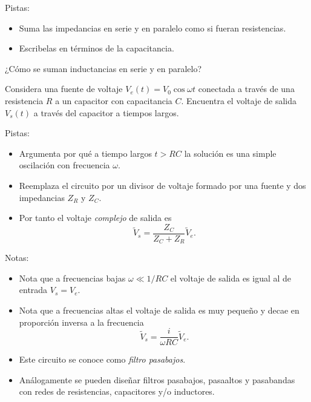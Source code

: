 \documentclass{exam}
\begin{document}
\begin{questions}
  Pistas:
    \begin{itemize}
    \item Suma las impedancias en serie y en paralelo como si fueran
      resistencias.
    \item Escribelas en términos de la capacitancia.
    \end{itemize}

    \question ¿Cómo se suman inductancias en serie y en paralelo?

    \question Considera una fuente de voltaje $V_e(t)=V_0\cos\omega t$
    conectada a través de una resistencia $R$ a un capacitor con
    capacitancia $C$.
    Encuentra el voltaje de salida $V_s(t)$ a través del capacitor a tiempos largos.

    Pistas:
    \begin{itemize}
    \item Argumenta por qué a tiempo largos $t>RC$ la solución es una
      simple oscilación con frecuencia $\omega$.
    \item Reemplaza el circuito por un divisor de voltaje formado por
      una fuente y dos impedancias $Z_R$ y $Z_C$.
    \item Por tanto el voltaje {\em complejo} de salida es
      $$\tilde V_s=\frac{Z_C}{Z_C+Z_R}\tilde V_e.$$
    \end{itemize}

    Notas:
    \begin{itemize}
    \item Nota que a frecuencias bajas $\omega\ll 1/RC$ el voltaje de
      salida es igual al de entrada $V_s=V_e$.
    \item Nota que a frecuencias altas el voltaje de salida es muy
      pequeño y decae en proporción inversa a la frecuencia
      $$\tilde V_s=\frac{i}{\omega RC} \tilde V_e.$$
    \item Este circuito se conoce como {\em filtro pasabajos}.
    \item Análogamente se pueden diseñar filtros pasabajos, pasaaltos
      y pasabandas con redes de resistencias, capacitores  y/o inductores.
    \end{itemize}


\end{questions}
\end{document}
